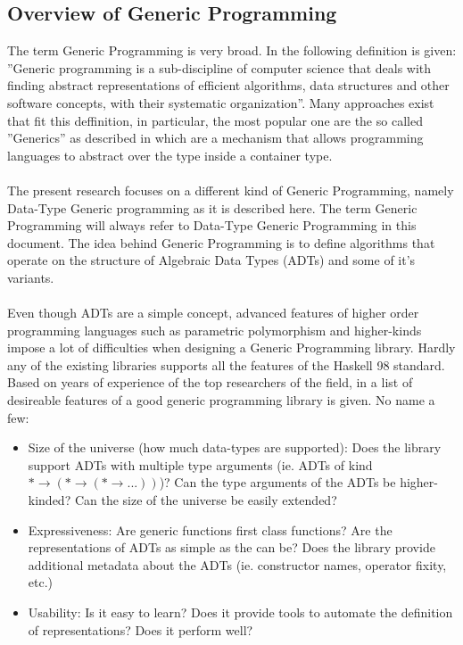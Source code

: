 \documentclass[8pt]{extarticle}
\begin{document}
\subsection{Overview of Generic Programming}
The term Generic Programming is very broad. In \cite{GenLangComp} the following definition is given: ''Generic programming is a sub-discipline of computer science that deals with finding abstract representations of efficient algorithms, data structures and other software concepts, with their systematic organization''. Many approaches exist that fit this deffinition, in particular, the most popular one are the so called ''Generics'' as described in \cite{GenLangComp} which are a mechanism that allows programming languages to abstract over the type inside a container type.
\\\\
The present research focuses on a different kind of Generic Programming, namely Data-Type Generic programming as it is described here\cite{CompGen}. The term Generic Programming will always refer to Data-Type Generic Programming in this document. The idea behind Generic Programming is to define algorithms that operate on the structure of Algebraic Data Types (ADTs) and some of it's variants.
\\\\
Even though ADTs are a simple concept, advanced features of higher order programming languages such as parametric polymorphism and higher-kinds impose a lot of difficulties when designing a Generic Programming library. Hardly any of the existing libraries \cite{CompGen} supports all the features of the Haskell 98 standard. Based on years of experience of the top researchers of the field, in \cite{CompGen} a list of desireable features of a good generic programming library is given. No name a few:
\begin{itemize}
\item Size of the universe (how much data-types are supported): Does the library support ADTs with multiple type arguments (ie. ADTs of kind $*\to (* \to (*\to ...))$)? Can the type arguments of the ADTs be higher-kinded? Can the size of the universe be easily extended?
\item Expressiveness: Are generic functions first class functions? Are the representations of ADTs as simple as the can be? Does the library provide additional metadata about the ADTs (ie. constructor names, operator fixity, etc.)
\item Usability: Is it easy to learn? Does it provide tools to automate the definition of representations? Does it perform well?
\end{itemize}
\end{document}
